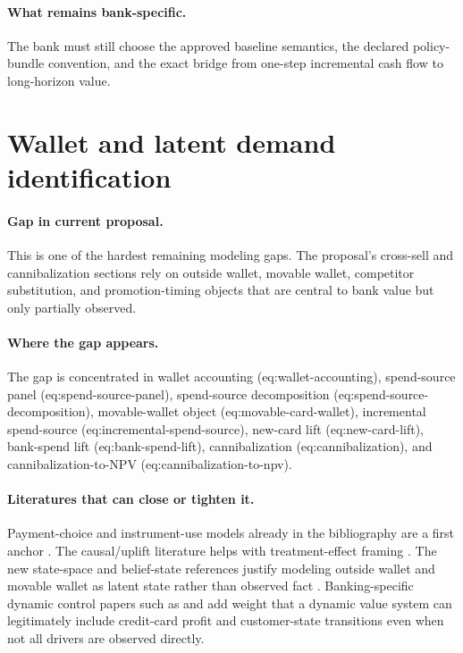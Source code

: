 \documentclass[11pt]{article}
\begin{document}
\paragraph{What remains bank-specific.}
The bank must still choose the approved baseline semantics, the declared
policy-bundle convention, and the exact bridge from one-step incremental cash
flow to long-horizon value.

\section{Wallet and latent demand identification}

\paragraph{Gap in current proposal.}
This is one of the hardest remaining modeling gaps. The proposal's cross-sell
and cannibalization sections rely on outside wallet, movable wallet, competitor
substitution, and promotion-timing objects that are central to bank value but
only partially observed.

\paragraph{Where the gap appears.}
The gap is concentrated in wallet accounting (eq:wallet-accounting),
spend-source panel (eq:spend-source-panel), spend-source decomposition
(eq:spend-source-decomposition), movable-wallet object
(eq:movable-card-wallet), incremental spend-source
(eq:incremental-spend-source), new-card lift (eq:new-card-lift), bank-spend
lift (eq:bank-spend-lift), cannibalization (eq:cannibalization), and
cannibalization-to-NPV (eq:cannibalization-to-npv).

\paragraph{Literatures that can close or tighten it.}
Payment-choice and instrument-use models already in the bibliography are a first
anchor \citep{koulayev2012payment,prelec2001creditcard,agarwal2010rewards}. The
causal/uplift literature helps with treatment-effect framing
\citep{rosenbaum1983propensity,lo2002true,wager2018causalforests,
chernozhukov2018dml}. The new state-space and belief-state references justify
modeling outside wallet and movable wallet as latent state rather than observed
fact \citep{smallwood1973pomdp,kaelbling1998pomdp,
durbinkoopman2012ssm,doucet2001smc}. Banking-specific dynamic control papers
such as \citet{trench2003bankone} and \citet{thomas2011creditcardmdp} add
weight that a dynamic value system can legitimately include credit-card profit
and customer-state transitions even when not all drivers are observed directly.
\end{document}
